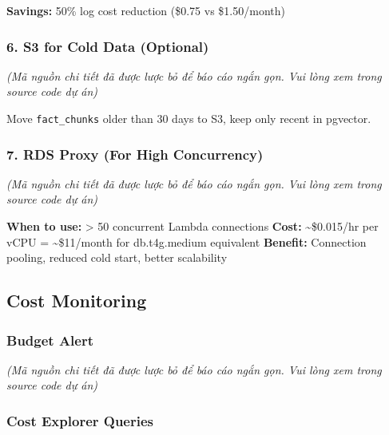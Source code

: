 \begin{Shaded}
\begin{Highlighting}[]
\NormalTok{\}}
\end{Highlighting}
\end{Shaded}

\textbf{Savings:} 50\% log cost reduction (\$0.75 vs \$1.50/month)

\hypertarget{s3-for-cold-data-optional}{%
\subsubsection{6. S3 for Cold Data
(Optional)}}

\emph{(Mã nguồn chi tiết đã được lược bỏ để báo cáo ngắn gọn. Vui lòng
xem trong source code dự án)}

Move \texttt{fact\_chunks} older than 30 days to S3, keep only recent in
pgvector.

\hypertarget{rds-proxy-for-high-concurrency}{%
\subsubsection{7. RDS Proxy (For High
Concurrency)}}

\emph{(Mã nguồn chi tiết đã được lược bỏ để báo cáo ngắn gọn. Vui lòng
xem trong source code dự án)}

\textbf{When to use:} \textgreater{} 50 concurrent Lambda connections
\textbf{Cost:} \textasciitilde\$0.015/hr per vCPU =
\textasciitilde\$11/month for db.t4g.medium equivalent \textbf{Benefit:}
Connection pooling, reduced cold start, better scalability

\hypertarget{cost-monitoring}{%
\subsection{Cost Monitoring}}

\hypertarget{budget-alert}{%
\subsubsection{Budget Alert}}

\emph{(Mã nguồn chi tiết đã được lược bỏ để báo cáo ngắn gọn. Vui lòng
xem trong source code dự án)}

\hypertarget{cost-explorer-queries}{%
\subsubsection{Cost Explorer Queries}}

